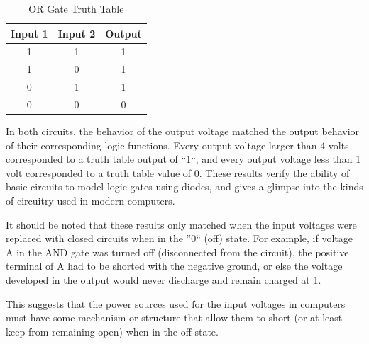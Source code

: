 \documentclass[twocolumn,english]{IEEEtran}
\begin{document}
\begin{table}[h]
\centering{}
\caption{OR Gate Truth Table}
\begin{tabular}{@{}ccc@{}}
\toprule
\textbf{Input 1} & \multicolumn{1}{l}{\textbf{Input 2}} & \multicolumn{1}{l}{\textbf{Output}} \\ \midrule
1                & 1                                    & 1                                   \\
1                & 0                                    & 1                                   \\
0                & 1                                    & 1                                   \\
0                & 0                                    & 0                                   \\ \bottomrule
\end{tabular}
\end{table}

In both circuits, the behavior of the output voltage matched the output behavior of their corresponding logic functions.
Every output voltage larger than 4 volts corresponded to a truth table output of ``1``, and every output voltage less than 1 volt corresponded to a truth table value of 0.
These results verify the ability of basic circuits to model logic gates using diodes, and gives a glimpse into the kinds of circuitry used in modern computers.

It should be noted that these results only matched when the input voltages were replaced with closed circuits when in the ''0`` (off) state.
For example, if voltage A in the AND gate was turned off (disconnected from the circuit), the positive terminal of A had to be shorted with the negative ground, or else the voltage developed in the output would never discharge and remain charged at 1.

This suggests that the power sources used for the input voltages in computers must have some mechanism or structure that allow them to short (or at least keep from remaining open) when in the off state.


\appendices{}

%
%
\end{document}
